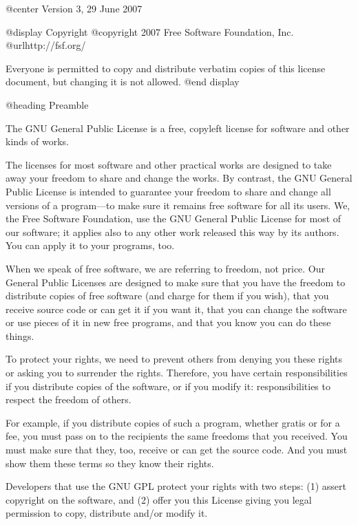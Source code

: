@center Version 3, 29 June 2007


@display
Copyright @copyright{} 2007 Free Software Foundation, Inc. @url{http://fsf.org/}

Everyone is permitted to copy and distribute verbatim copies of this
license document, but changing it is not allowed.
@end display

@heading Preamble

The GNU General Public License is a free, copyleft license for
software and other kinds of works.

The licenses for most software and other practical works are designed
to take away your freedom to share and change the works.  By contrast,
the GNU General Public License is intended to guarantee your freedom
to share and change all versions of a program---to make sure it remains
free software for all its users.  We, the Free Software Foundation,
use the GNU General Public License for most of our software; it
applies also to any other work released this way by its authors.  You
can apply it to your programs, too.

When we speak of free software, we are referring to freedom, not
price.  Our General Public Licenses are designed to make sure that you
have the freedom to distribute copies of free software (and charge for
them if you wish), that you receive source code or can get it if you
want it, that you can change the software or use pieces of it in new
free programs, and that you know you can do these things.

To protect your rights, we need to prevent others from denying you
these rights or asking you to surrender the rights.  Therefore, you
have certain responsibilities if you distribute copies of the
software, or if you modify it: responsibilities to respect the freedom
of others.

For example, if you distribute copies of such a program, whether
gratis or for a fee, you must pass on to the recipients the same
freedoms that you received.  You must make sure that they, too,
receive or can get the source code.  And you must show them these
terms so they know their rights.

Developers that use the GNU GPL protect your rights with two steps:
(1) assert copyright on the software, and (2) offer you this License
giving you legal permission to copy, distribute and/or modify it.

